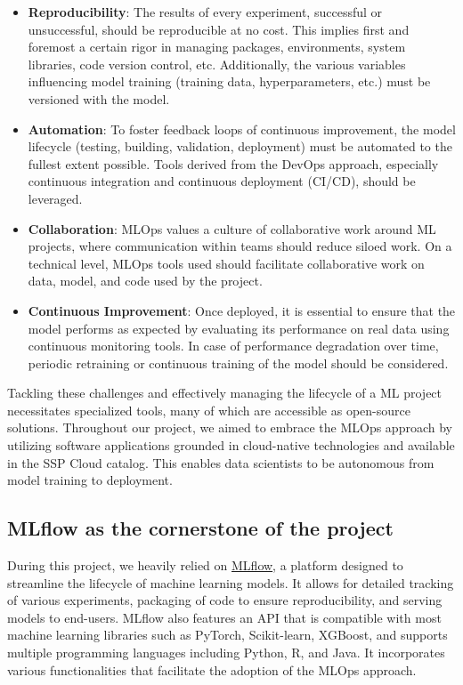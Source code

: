 \begin{itemize}
    \item \textbf{Reproducibility}: The results of every experiment, successful or unsuccessful, should be reproducible at no cost. This implies first and foremost a certain rigor in managing packages, environments, system libraries, code version control, etc. Additionally, the various variables influencing model training (training data, hyperparameters, etc.) must be versioned with the model.
    
    \item \textbf{Automation}: To foster feedback loops of continuous improvement, the model lifecycle (testing, building, validation, deployment) must be automated to the fullest extent possible. Tools derived from the DevOps approach, especially continuous integration and continuous deployment (CI/CD), should be leveraged.
    
    \item \textbf{Collaboration}: MLOps values a culture of collaborative work around ML projects, where communication within teams should reduce siloed work. On a technical level, MLOps tools used should facilitate collaborative work on data, model, and code used by the project.
    
    \item \textbf{Continuous Improvement}: Once deployed, it is essential to ensure that the model performs as expected by evaluating its performance on real data using continuous monitoring tools. In case of performance degradation over time, periodic retraining or continuous training of the model should be considered.
\end{itemize}


Tackling these challenges and effectively managing the lifecycle of a ML project necessitates specialized tools, many of which are accessible as open-source solutions. Throughout our project, we aimed to embrace the MLOps approach by utilizing software applications grounded in cloud-native technologies and available in the SSP Cloud catalog. This enables data scientists to be autonomous from model training to deployment.

\subsection{MLflow as the cornerstone of the project}

During this project, we heavily relied on \href{https://github.com/MLflow/MLflow}{MLflow}, a platform designed to streamline the lifecycle of machine learning models. It allows for detailed tracking of various experiments, packaging of code to ensure reproducibility, and serving models to end-users. MLflow also features an API that is compatible with most machine learning libraries such as PyTorch, Scikit-learn, XGBoost, and supports multiple programming languages including Python, R, and Java. It incorporates various functionalities that facilitate the adoption of the MLOps approach.

